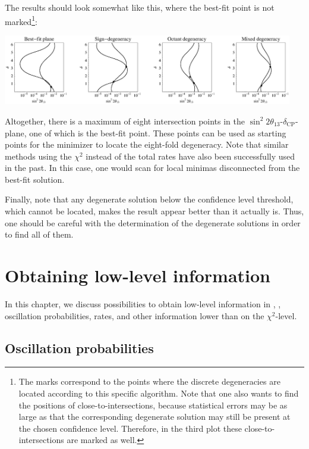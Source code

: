 \begin{description}
The results should look somewhat like this, where the best-fit point is not marked\footnote{The marks correspond to the points where the discrete degeneracies are located according to this specific algorithm. Note that
one also wants to find the positions of close-to-intersections, because statistical errors may be as large
as that the corresponding degenerate solution may still be present at the chosen confidence level.
Therefore, in the third plot these close-to-intersections are marked as well.}:
\begin{center}
\includegraphics[width=0.95\textwidth]{ircurves}
\end{center}
 Altogether, there is a maximum of eight intersection points in the $\sin^2 2 \theta_{13}$-$\delta_{\mathrm{CP}}$-plane, one of which is the best-fit point. These points can be used as starting points for the minimizer to locate the eight-fold degeneracy. Note that similar methods using the $\chi^2$ instead of the total rates have also been successfully used in the past.  In this case, one would scan for local minimas
disconnected from the best-fit solution.
\end{description}
Finally, note that any degenerate solution below the confidence level threshold, which cannot be located, makes the result appear better than it actually is. Thus, one should be careful with the determination of the degenerate solutions in order to find all of them.


\chapter{Obtaining low-level information}

In this chapter, we discuss possibilities to obtain low-level information
in \GLOBES , \ie, oscillation probabilities, rates, and other
information lower than on the $\chi^2$-level.

\section{Oscillation probabilities}

